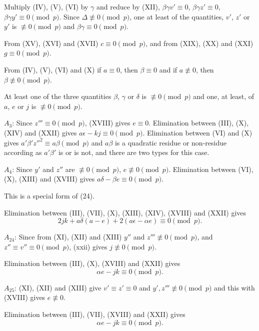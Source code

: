 \documentclass[oneside]{article}
\begin{document}
Multiply (IV), (V), (VI) by $\gamma$ and reduce by (XII), $\beta\gamma v'
\equiv 0$, $\beta\gamma z' \equiv 0$, $\beta\gamma y' \equiv 0 \pmod{p}$. Since
$\Delta \not\equiv 0 \pmod{p}$, one at least of the quantities, $v'$, $z'$
or $y'$ is $\not\equiv 0 \pmod{p}$ and $\beta\gamma \equiv 0 \pmod{p}$.

From (XV), (XVI) and (XVII) $c \equiv 0 \pmod{p}$, and from (XIX), (XX) and
(XXI) $g \equiv 0 \pmod{p}$.

From (IV), (V), (VI) and (X) if $a \equiv 0$, then $\beta \equiv 0$
and if $a \not\equiv 0$, then $\beta \not\equiv 0 \pmod{p}$.

At least one of the three quantities $\beta$, $\gamma$ or $\delta$ is
$\not\equiv 0 \pmod{p}$ and one, at least, of $a$, $e$ or $j$ is $\not
\equiv 0 \pmod{p}$.

\smallskip
$A_3$: Since $z''' \equiv 0 \pmod{p}$, (XVIII) gives $e \equiv 0$.
Elimination between (III), (X), (XIV) and (XXII) gives $a\epsilon - kj
\equiv 0 \pmod{p}$. Elimination between (VI) and (X) gives
$a'\beta'{z''}^2 \equiv a\beta \pmod{p}$ and $a\beta$ is a quadratic
residue or non-residue according as $a'\beta'$ is or is not, and there are
two types for this case.

\smallskip
$A_4$: Since $y'$ and $z''$ are $\not\equiv 0 \pmod{p}$, $e \not\equiv 0
\pmod{p}$. Elimination between (VI), (X), (XIII) and (XVIII) gives $a\delta
- \beta e \equiv 0 \pmod{p}$.

This is a special form of (24).

Elimination between (III), (VII), (X), (XIII), (XIV), (XVIII) and (XXII)
gives
\begin{equation*}
2jk + a\delta(a - e) + 2(a\epsilon - \alpha e) \equiv 0 \pmod{p}.
\end{equation*}

\smallskip
$A_{24}$: Since from (XI), (XII) and (XIII) $y''$ and $z''' \not\equiv 0
\pmod{p}$, and $z'' \equiv v'' \equiv 0 \pmod{p}$, (xxii) gives $j \not
\equiv 0 \pmod{p}$.

Elimination between (III), (X), (XVIII) and (XXII) gives
\begin{equation*}
\alpha e - jk \equiv 0 \pmod{p}.
\end{equation*}

\smallskip
$A_{25}$: (XI), (XII) and (XIII) give $v' \equiv z' \equiv 0$ and $y', z'''
\not\equiv 0 \pmod{p}$ and this with (XVIII) gives $e \not\equiv 0$.

Elimination between (III), (VII), (XVIII) and (XXII) gives
\begin{equation*}
\alpha e - jk \equiv 0 \pmod{p}.
\end{equation*}
\end{document}
